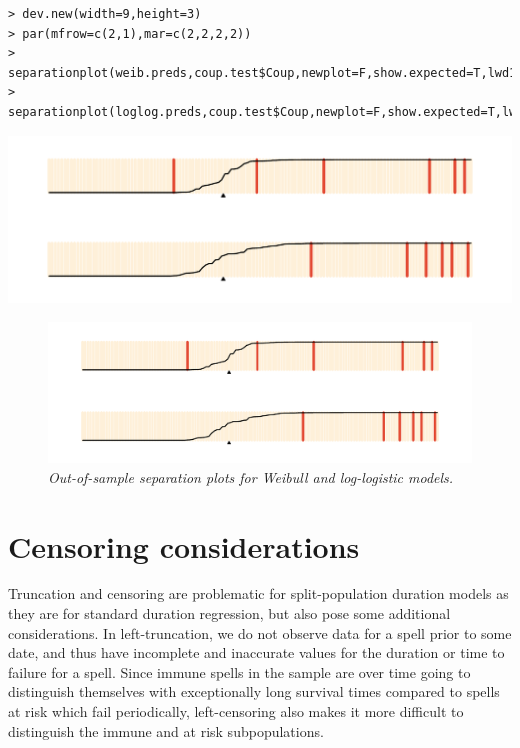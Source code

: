 \documentclass[article]{jss}
\begin{document}
\begin{verbatim}
> dev.new(width=9,height=3)
> par(mfrow=c(2,1),mar=c(2,2,2,2))
> separationplot(weib.preds,coup.test$Coup,newplot=F,show.expected=T,lwd1=5,lwd2=2)
> separationplot(loglog.preds,coup.test$Coup,newplot=F,show.expected=T,lwd1=5,lwd2=2)
\end{verbatim}

\includegraphics{out-of-sample.pdf}

\normalsize

\begin{figure}[htbp!]
\centering
\includegraphics[width=5in]{out-of-sample.pdf}
\caption{{\em Out-of-sample separation plots for Weibull and log-logistic models. }} \label{outsamp}
\end{figure}

\section{Censoring considerations}

Truncation and censoring are problematic for split-population duration
models as they are for standard duration regression, but also pose some
additional considerations. In left-truncation, we do not observe data
for a spell prior to some date, and thus have incomplete and inaccurate
values for the duration or time to failure for a spell. Since immune
spells in the sample are over time going to distinguish themselves with
exceptionally long survival times compared to spells at risk which fail
periodically, left-censoring also makes it more difficult to distinguish
the immune and at risk subpopulations.
\end{document}
